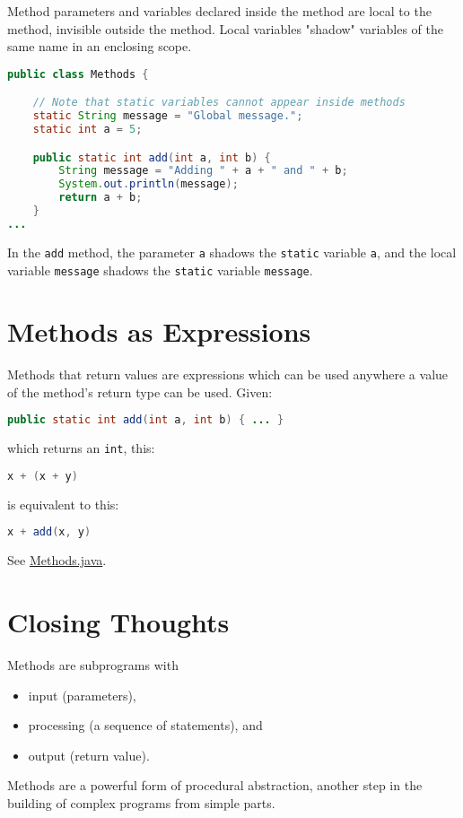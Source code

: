 \documentclass{article}
\begin{document}
Method parameters and variables declared inside the method are local to the method, invisible outside the method.  Local variables "shadow" variables of the same name in an enclosing scope.

\begin{lstlisting}[language=Java]
public class Methods {

    // Note that static variables cannot appear inside methods
    static String message = "Global message.";
    static int a = 5;

    public static int add(int a, int b) {
        String message = "Adding " + a + " and " + b;
        System.out.println(message);
        return a + b;
    }
...
\end{lstlisting}
In the {\tt add} method, the parameter {\tt a} shadows the {\tt static} variable {\tt a}, and the local variable {\tt message} shadows the {\tt static} variable {\tt message}.


\section{Methods as Expressions}

Methods that return values are expressions which can be used anywhere a value of the method's return type can be used.  Given:

\begin{lstlisting}[language=Java]
public static int add(int a, int b) { ... }
\end{lstlisting}
which returns an {\tt int}, this:
\begin{lstlisting}[language=Java]
x + (x + y)
\end{lstlisting}
is equivalent to this:
\begin{lstlisting}[language=Java]
x + add(x, y)
\end{lstlisting}
See \href{\code/basics/Methods.java}{Methods.java}.



\section{Closing Thoughts}

Methods are subprograms with
\begin{itemize}
\item input (parameters),
\item processing (a sequence of statements), and
\item output (return value).
\end{itemize}

Methods are a powerful form of procedural abstraction, another step in the building of complex programs from simple parts.
\end{document}
